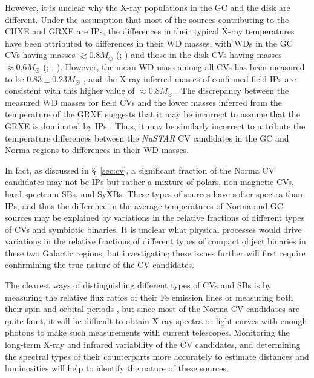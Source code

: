\documentclass[iop,revtex4]{emulateapj}
\begin{document}
However, it is unclear why the X-ray populations in the GC and the disk are different.   Under the assumption that most of the sources contributing to the CHXE and GRXE are IPs, the differences in their typical X-ray temperatures have been attributed to differences in their WD masses, with WDs in the GC CVs having masses $\gtrsim0.8M_{\odot}$ (\citealt{perez15}; \citealt{hong16}) and those in the disk CVs having masses $\approx0.6M_{\odot}$ (\citealt{krivonos07}; \citealt{turler10}; \citealt{yuasa12}).  However, the mean WD mass among all CVs has been measured to be $0.83\pm0.23M_{\odot}$ \citep{zorotovic11}, and the X-ray inferred masses of confirmed field IPs are consistent with this higher value of $\approx0.8M_{\odot}$ \citep{hailey16}.  The discrepancy between the measured WD masses for field CVs and the lower masses inferred from the temperature of the GRXE suggests that it may be incorrect to assume that the GRXE is dominated by IPs \citep{hailey16}.  Thus, it may be similarly incorrect to attribute the temperature differences between the \textit{NuSTAR} CV candidates in the GC and Norma regions to differences in their WD masses. \par
In fact, as discussed in \S~\ref{sec:cv}, a significant fraction of the Norma CV candidates may not be IPs but rather a mixture of polars, non-magnetic CVs, hard-spectrum SBs, and SyXBs.  These types of sources have softer spectra than IPs, and thus the difference in the average temperatures of Norma and GC sources may be explained by variations in the relative fractions of different types of CVs and symbiotic binaries.  It is unclear what physical processes would drive variations in the relative fractions of different types of compact object binaries in these two Galactic regions, but investigating these issues further will first require confirmining the true nature of the CV candidates.  \par
The clearest ways of distinguishing different types of CVs and SBs is by measuring the relative flux ratios of their Fe emission lines \citep{xu16} or measuring both their spin and orbital periods \citep{scaringi10}, but since most of the Norma CV candidates are quite faint, it will be difficult to obtain X-ray spectra or light curves with enough photons to make such measurements with current telescopes.  Monitoring the long-term X-ray and infrared variability of the CV candidates, and determining the spectral types of their counterparts more accurately to estimate distances and luminosities will help to identify the nature of these sources.  
\end{document}

